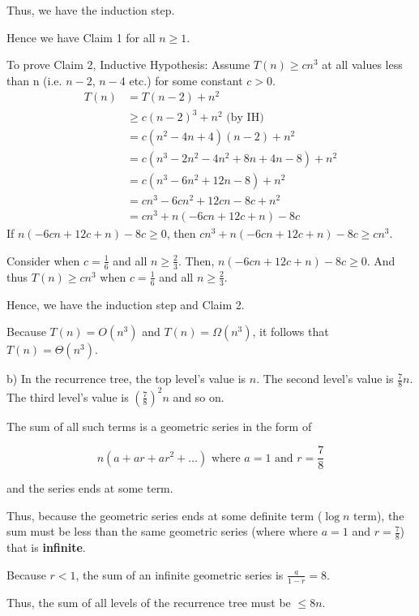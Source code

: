 \documentclass[a4paper]{report}
\begin{document}
\begin{enumerate}
      Thus, we have the induction step.

      Hence we have Claim 1 for all $n \geq 1$.
      

      To prove Claim 2, 
      Inductive Hypothesis: Assume $T(n) \geq cn^3$ at all values less than n (i.e. $n-2$, $n-4$ etc.) for some constant $c>0$.
      \begin{align}
        T(n) &= T(n-2) + n^2  \\
        &\geq c(n-2)^3 + n^2  \text{         (by IH)}\\
        &= c(n^2 - 4n + 4)(n-2) + n^2 \\
        &= c(n^3 - 2n^2 - 4n^2 + 8n + 4n - 8) + n^2 \\
        &= c(n^3 - 6n^2 + 12n - 8) + n^2  \\
        &= cn^3 - 6cn^2 + 12cn - 8c + n^2  \\
        &= cn^3 + n(-6cn + 12c + n) - 8c   
      \end{align}
      If $n(-6cn + 12c + n) - 8c \geq 0$, then $cn^3 + n(-6cn + 12c + n) - 8c \geq cn^3$.

      Consider when $c=\frac{1}{6}$ and all $n\geq\frac{2}{3}$. Then, $n(-6cn + 12c + n) - 8c \geq 0$.
      And thus $T(n) \geq cn^3$ when $c=\frac{1}{6}$ and all $n\geq\frac{2}{3}$.

      Hence, we have the induction step and Claim 2.

      Because $T(n) = O(n^3)$ and $T(n) = \Omega(n^3)$, it follows that $T(n) = \Theta(n^3)$.

      \bigskip
      b)
      In the recurrence tree, the top level's value is $n$. The second level's value is $\frac{7}{8}n$.
      The third level's value is $(\frac{7}{8})^2n$ and so on.

      The sum of all such terms is a geometric series in the form of 

      $$n(a + ar + ar^2 + \dots) \text{ where } a=1 \text{ and } r=\frac{7}{8}$$

      and the series ends at some term.

      Thus, because the geometric series ends at some definite term ($\log n$ term), the sum must be less than the same geometric series (where 
      where $a=1$ and $r=\frac{7}{8}$) that is {\bf infinite}.

      Because $r < 1$, the sum of an infinite geometric series is $\frac{a}{1-r} = 8$.

      Thus, the sum of all levels of the recurrence tree must be $\leq 8n$. 


\end{enumerate}
\end{document}
